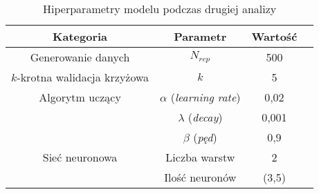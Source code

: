 \documentclass[11pt]{book}
\theoremstyle{definition}
\begin{document}
%
\begin{table}
	\centering
	\caption{Hiperparametry modelu podczas drugiej analizy}\label{tab:hyper2} 
	\begin{tabular}{c|c c c}
		\hline 
		Kategoria & Parametr & Wartość &   \\\hline
		Generowanie danych & $N_{rep}$ & 500 & \\ \hline
		$k$-krotna walidacja krzyżowa & $k$ & 5 &\\ \hline
		
		Algorytm uczący& $\alpha$ (\textit{learning rate}) & 0,02 & \\ 
		& $\lambda$ (\textit{decay}) & 0,001 & \\ 
		& $\beta$ (\textit{pęd}) & 0,9 & \\ \hline
		Sieć neuronowa & Liczba warstw & 2 & \\ 
		& Ilość neuronów & (3,5) & \\ \hline
		
	\end{tabular}
\end{table}
\end{document}

